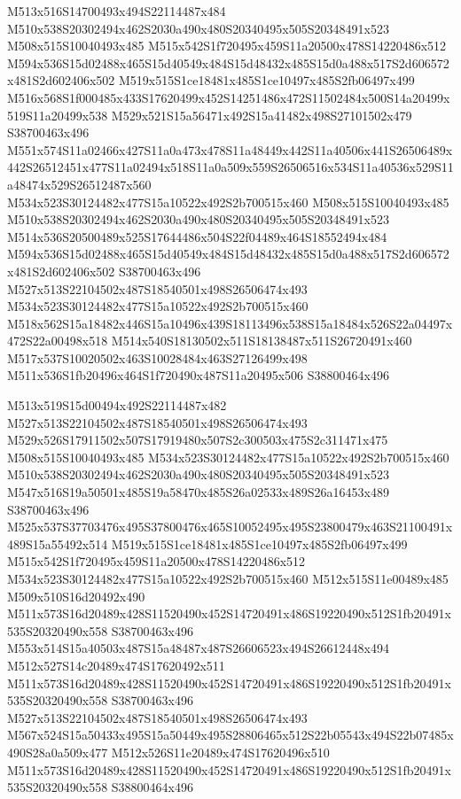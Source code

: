 \documentclass{article}
\begin{document}
\begin{multicols}{2}
M513x516S14700493x494S22114487x484 M510x538S20302494x462S2030a490x480S20340495x505S20348491x523 M508x515S10040493x485 M515x542S1f720495x459S11a20500x478S14220486x512 M594x536S15d02488x465S15d40549x484S15d48432x485S15d0a488x517S2d606572x481S2d602406x502 M519x515S1ce18481x485S1ce10497x485S2fb06497x499 M516x568S1f000485x433S17620499x452S14251486x472S11502484x500S14a20499x519S11a20499x538 M529x521S15a56471x492S15a41482x498S27101502x479 S38700463x496 M551x574S11a02466x427S11a0a473x478S11a48449x442S11a40506x441S26506489x442S26512451x477S11a02494x518S11a0a509x559S26506516x534S11a40536x529S11a48474x529S26512487x560 M534x523S30124482x477S15a10522x492S2b700515x460 M508x515S10040493x485 M510x538S20302494x462S2030a490x480S20340495x505S20348491x523 M514x536S20500489x525S17644486x504S22f04489x464S18552494x484 M594x536S15d02488x465S15d40549x484S15d48432x485S15d0a488x517S2d606572x481S2d602406x502 S38700463x496 M527x513S22104502x487S18540501x498S26506474x493 M534x523S30124482x477S15a10522x492S2b700515x460 M518x562S15a18482x446S15a10496x439S18113496x538S15a18484x526S22a04497x472S22a00498x518 M514x540S18130502x511S18138487x511S26720491x460 M517x537S10020502x463S10028484x463S27126499x498 M511x536S1fb20496x464S1f720490x487S11a20495x506 S38800464x496

M513x519S15d00494x492S22114487x482 M527x513S22104502x487S18540501x498S26506474x493 M529x526S17911502x507S17919480x507S2c300503x475S2c311471x475 M508x515S10040493x485 M534x523S30124482x477S15a10522x492S2b700515x460 M510x538S20302494x462S2030a490x480S20340495x505S20348491x523 M547x516S19a50501x485S19a58470x485S26a02533x489S26a16453x489 S38700463x496 M525x537S37703476x495S37800476x465S10052495x495S23800479x463S21100491x489S15a55492x514 M519x515S1ce18481x485S1ce10497x485S2fb06497x499 M515x542S1f720495x459S11a20500x478S14220486x512 M534x523S30124482x477S15a10522x492S2b700515x460 M512x515S11e00489x485 M509x510S16d20492x490 M511x573S16d20489x428S11520490x452S14720491x486S19220490x512S1fb20491x535S20320490x558 S38700463x496 M553x514S15a40503x487S15a48487x487S26606523x494S26612448x494 M512x527S14c20489x474S17620492x511 M511x573S16d20489x428S11520490x452S14720491x486S19220490x512S1fb20491x535S20320490x558 S38700463x496 M527x513S22104502x487S18540501x498S26506474x493 M567x524S15a50433x495S15a50449x495S28806465x512S22b05543x494S22b07485x490S28a0a509x477 M512x526S11e20489x474S17620496x510 M511x573S16d20489x428S11520490x452S14720491x486S19220490x512S1fb20491x535S20320490x558 S38800464x496


\end{multicols}
\end{document}
